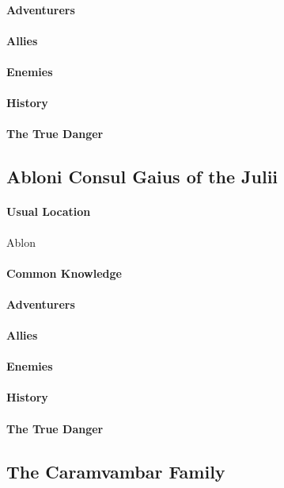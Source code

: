 \begin{multicols}{2}
    \paragraph{Adventurers}
    \paragraph{Allies}
    \paragraph{Enemies}
    \paragraph{History}
    \paragraph{The True Danger}
    
\subsection{Abloni Consul Gaius of the Julii}
    \paragraph{Usual Location} Ablon
    \paragraph{Common Knowledge} 
    \paragraph{Adventurers}
    \paragraph{Allies}
    \paragraph{Enemies}
    \paragraph{History}
    \paragraph{The True Danger}
    
\subsection{The Caramvambar Family}

\end{multicols}
